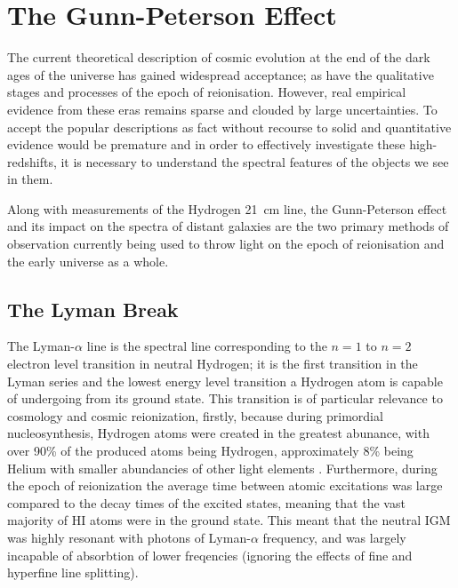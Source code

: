
\section{The Gunn-Peterson Effect} %
\label{sec:the_gunn_peterson_effect}
	The current theoretical description of cosmic evolution at the end of the dark ages of the universe has gained widespread acceptance; as have the qualitative stages and processes of the epoch of reionisation. However, real empirical evidence from these eras remains sparse and clouded by large uncertainties. To accept the popular descriptions as fact without recourse to solid and quantitative evidence would be premature and in order to effectively investigate these high-redshifts, it is necessary to understand the spectral features of the objects we see in them.

	Along with measurements of the Hydrogen \SI{21}{\centi\metre} line, the Gunn-Peterson effect and its impact on the spectra of distant galaxies are the two primary methods of observation currently being used to throw light on the epoch of reionisation and the early universe as a whole.

	\subsection{The Lyman Break} %
	\label{sub:the_lyman_break}
		The Lyman-$\alpha$ line is the spectral line corresponding to the $n=1$ to $n=2$ electron level transition in neutral Hydrogen; it is the first transition in the Lyman series and the lowest energy level transition a Hydrogen atom is capable of undergoing from its ground state. This transition is of particular relevance to cosmology and cosmic reionization, firstly, because during primordial nucleosynthesis, Hydrogen atoms were created in the greatest abunance, with over 90\% of the produced atoms being Hydrogen, approximately 8\% being Helium with smaller abundancies of other light elements \cite{BBNabundance}. Furthermore, during the epoch of reionization the average time between atomic excitations was large compared to the decay times of the excited states, meaning that the vast majority of HI atoms were in the ground state. This meant that the neutral IGM was highly resonant with photons of Lyman-$\alpha$ frequency, and was largely incapable of absorbtion of lower freqencies (ignoring the effects of fine and hyperfine line splitting).

